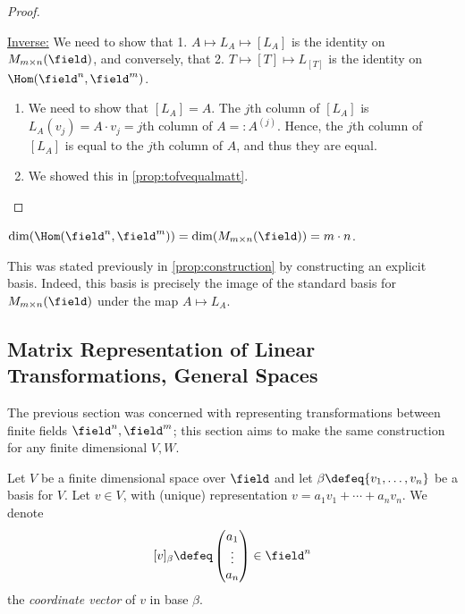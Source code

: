 \begin{proof}
\begin{enumerate}
    \end{enumerate}
    \underline{Inverse:} We need to show that 1. $A \mapsto L_A \mapsto [L_A]$ is the identity on $M_{m \times n}(\field)$, and conversely, that 2. $T \mapsto [T] \mapsto L_{[T]}$ is the identity on $\Hom(\field^n, \field^m)$.
    \begin{enumerate}
        \item We need to show that $[L_A] = A$. The $j$th column of $[L_A]$ is $L_A(v_j) = A \cdot v_j = j$th column of $A =: A^{(j)}$. Hence, the $j$th column of $[L_A]$ is equal to the $j$th column of $A$, and thus they are equal.
        \item We showed this in \cref{prop:tofvequalmatt}.
    \end{enumerate}
\end{proof}

\begin{corollary}
    $\dim(\Hom(\field^n, \field^m)) = \dim(M_{m\times n}(\field)) = m \cdot n$.
\end{corollary}
\begin{remark}
    This was stated previously in \cref{prop:construction} by constructing an explicit basis. Indeed, this basis is precisely the image of the standard basis for $M_{m \times n}(\field)$ under the map $A \mapsto L_A$.
\end{remark}

\subsection{Matrix Representation of Linear Transformations, General Spaces}

\begin{remark}
    The previous section was concerned with representing transformations between finite fields $\field^n, \field^m$; this section aims to make the same construction for any finite dimensional $V, W$.
\end{remark}

\begin{definition}
    Let $V$ be a finite dimensional space over $\field$ and let $\beta \defeq \{v_1, \dots, v_n\}$ be a basis for $V$. Let $v \in V$, with (unique) representation $v = a_1 v_1 + \cdots + a_n v_n$. We denote \[
    [v]_\beta \defeq \begin{pmatrix}
        a_1\\
        \vdots\\
        a_n
    \end{pmatrix}     \in \field^n
    \]
    the \emph{coordinate vector} of $v$ in base $\beta$.
\end{definition}

